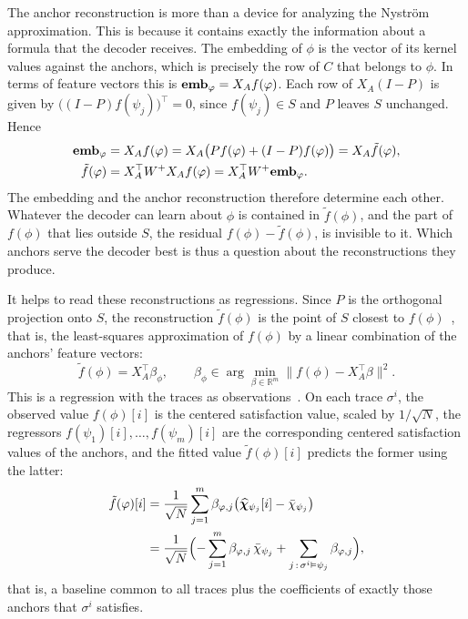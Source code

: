 \documentclass[titlepage,a4paper,11pt]{report}
\begin{document}
    The anchor reconstruction is more than a device for analyzing the Nyström approximation. This is because it contains exactly the information about a formula that the decoder receives. The embedding of $\phi$ is the vector of its kernel values against the anchors, which is precisely the row of $C$ that belongs to $\phi$. In terms of feature vectors this is $\textbf{emb}_\varphi = X_A f(\varphi)$. Each row of $X_A(I-P)$ is given by $\bigl((I-P)f(\psi_j)\bigr)^\top = 0$, since $f(\psi_j)\in S$ and $P$ leaves $S$ unchanged. Hence
    \begin{equation}\label{eq:embedding_reconstruction}
        \begin{aligned}
        \textbf{emb}_\varphi &= X_A f(\varphi) = X_A\bigl(Pf(\varphi)+(I-P)f(\varphi)\bigr) = X_A\tilde f(\varphi),\\
        \tilde f(\varphi) &= X_A^\top W^{+}X_A f(\varphi) = X_A^\top W^{+} \textbf{emb}_\varphi .
        \end{aligned}
    \end{equation}
    The embedding and the anchor reconstruction therefore determine each other. Whatever the decoder can learn about $\phi$ is contained in $\tilde f(\phi)$, and the part of $f(\phi)$ that lies outside $S$, the residual $f(\phi)-\tilde f(\phi)$, is invisible to it. Which anchors serve the decoder best is thus a question about the reconstructions they produce.

    It helps to read these reconstructions as regressions. Since $P$ is the orthogonal projection onto $S$, the reconstruction $\tilde f(\phi)$ is the point of $S$ closest to $f(\phi)$~\citep{ben-israel_generalized_2003}, that is, the least-squares approximation of $f(\phi)$ by a linear combination of the anchors' feature vectors:
    \begin{equation}\label{eq:anchor_reconstruction}
        \tilde f(\phi) = X_A^\top\beta_\phi,
        \qquad
        \beta_\phi\in\arg\min_{\beta\in\mathbb R^m}\bigl\lVert f(\phi)-X_A^\top\beta\bigr\rVert^2 .
    \end{equation}
    This is a regression with the traces as observations~\citep{anderson_introduction_2003}. On each trace $\sigma^i$, the observed value $f(\phi)[i]$ is the centered satisfaction value, scaled by $1/\sqrt N$, the regressors $f(\psi_1)[i],\dots,f(\psi_m)[i]$ are the corresponding centered satisfaction values of the anchors, and the fitted value $\tilde f(\phi)[i]$ predicts the former using the latter:
    \begin{equation}\label{eq:anchor_reconstruction_sat_i}
        \begin{split}
            \tilde f(\varphi)[i]
            &= \frac{1}{\sqrt N}\sum_{j=1}^{m}\beta_{\varphi,j}\bigl(\bm{\widehat\chi}_{\psi_j}[i]-\bar\chi_{\psi_j}\bigr)\\
            &= \frac{1}{\sqrt N}\Bigl(-\sum_{j=1}^{m}\beta_{\varphi,j}\,\bar\chi_{\psi_j}+\sum_{j\,:\,\sigma^i\vDash\psi_j}\beta_{\varphi,j}\Bigr),
        \end{split}
    \end{equation}
    that is, a baseline common to all traces plus the coefficients of exactly those anchors that $\sigma^i$ satisfies.
\end{document}
